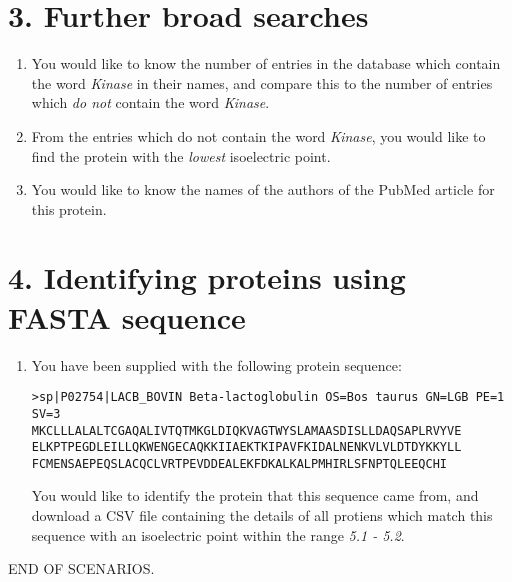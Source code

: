 \section*{3. Further broad searches}
\begin{enumerate}
\item You would like to know the number of entries in the database
  which contain the word \textit{Kinase} in their names, and compare
  this to the number of entries which \textit{do not} contain the word
  \textit{Kinase}.
\item From the entries which do not contain the word \textit{Kinase},
  you would like to find the protein with the \textit{lowest}
  isoelectric point.
\item You would like to know the names of the authors of the PubMed
  article for this protein.
\end{enumerate}

\section*{4. Identifying proteins using FASTA sequence}
\begin{enumerate}
\item You have been supplied with the following protein sequence:
\begin{verbatim}
>sp|P02754|LACB_BOVIN Beta-lactoglobulin OS=Bos taurus GN=LGB PE=1 SV=3
MKCLLLALALTCGAQALIVTQTMKGLDIQKVAGTWYSLAMAASDISLLDAQSAPLRVYVE
ELKPTPEGDLEILLQKWENGECAQKKIIAEKTKIPAVFKIDALNENKVLVLDTDYKKYLL
FCMENSAEPEQSLACQCLVRTPEVDDEALEKFDKALKALPMHIRLSFNPTQLEEQCHI
\end{verbatim}

You would like to identify the protein that this sequence came from,
and download a CSV file containing the details of all protiens which
match this sequence with an isoelectric point within the range
\textit{5.1 - 5.2}.
\end{enumerate}

{\centering END OF SCENARIOS.\par}
